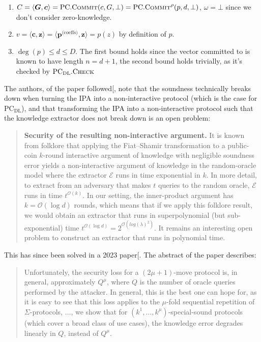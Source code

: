 \documentclass[
]{article}
\providecommand{\tightlist}{%
  \setlength{\itemsep}{0pt}\setlength{\parskip}{0pt}}
\newcommand*\Ec{\mathcal{E}}
\newcommand*\Oc{\mathcal{O}}
\renewcommand*\l{\lambda}
\renewcommand*\o{\omega}
\renewcommand{\vec}[1]{ \boldsymbol{#1} }
\newcommand{\ip}[2]{ \langle #1, #2 \rangle }
\newcommand*{\Commit}{\mathrm{\text{C{\scriptsize OMMIT}}}}
\newcommand*{\PC}{\text{PC}}
\newcommand*{\PCCommit}{\PC.\Commit}
\newcommand*{\PCDL}{\text{PC}_{\text{DL}}}
\newcommand*{\PCDLCheck}{\PCDL.\mathrm{\text{C\scriptsize HECK}}}
\begin{document}
\begin{enumerate}
\def\labelenumi{\arabic{enumi}.}
\tightlist
\item
  \(C = \ip{\vec{G}}{\vec{c}} = \PCCommit(c, G, \bot) = \PCCommit^\rho(p,
  d, \bot)\), \(\o = \bot\) since we don't consider zero-knowledge.
\item
  \(v = \ip{\vec{c}}{\vec{z}} = \ip{\vec{p}^{\text{(coeffs)}}}{\vec{z}} =
  p(z)\) by definition of \(p\).
\item
  \(\deg(p) \leq d \leq D\). The first bound holds since the vector
  committed to is known to have length \(n = d+1\), the second bound
  holds trivially, as it's checked by \(\PCDLCheck\)
\end{enumerate}

The authors, of the paper followed{[}\citeproc{ref-pcd}{Bünz et al.
2020}{]}, note that the soundness technically breaks down when turning
the IPA into a non-interactive protocol (which is the case for
\(\PCDL\)), and that transforming the IPA into a non-interactive
protocol such that the knowledge extractor does not break down is an
open problem:

\begin{quote}
\color{GbGrey}

\textbf{Security of the resulting non-interactive argument.} It is known
from folklore that applying the Fiat–Shamir transformation to a public-coin
$k$-round interactive argument of knowledge with negligible soundness error
yields a non-interactive argument of knowledge in the random-oracle model
where the extractor $\Ec$ runs in time exponential in $k$. In more detail, to
extract from an adversary that makes $t$ queries to the random oracle, $\Ec$
runs in time $t^{\Oc(k)}$. In our setting, the inner-product argument has $k
= \Oc(\log d)$ rounds, which means that if we apply this folklore result, we
would obtain an extractor that runs in superpolynomial (but sub-exponential)
time $t^{\Oc(\log d)} = 2^{\Oc(log(\l)^2)}$. It remains an interesting open
problem to construct an extractor that runs in polynomial time.

\end{quote}

This has since been solved in a 2023
paper{[}\citeproc{ref-attema}{Attema et al. 2023}{]}. The abstract of
the paper describes:

\begin{quote}
\color{GbGrey}

Unfortunately, the security loss for a $(2\mu + 1)$-move protocol is, in
general, approximately $Q^\mu$, where $Q$ is the number of oracle queries
performed by the attacker. In general, this is the best one can hope for,
as it is easy to see that this loss applies to the $\mu$-fold sequential
repetition of $\Sigma$-protocols, $\dots$, we show that for $(k^1, \dots,
k^\mu)$-special-sound protocols (which cover a broad class of use cases),
the knowledge error degrades linearly in $Q$, instead of $Q^\mu$.

\end{quote}
\end{document}
